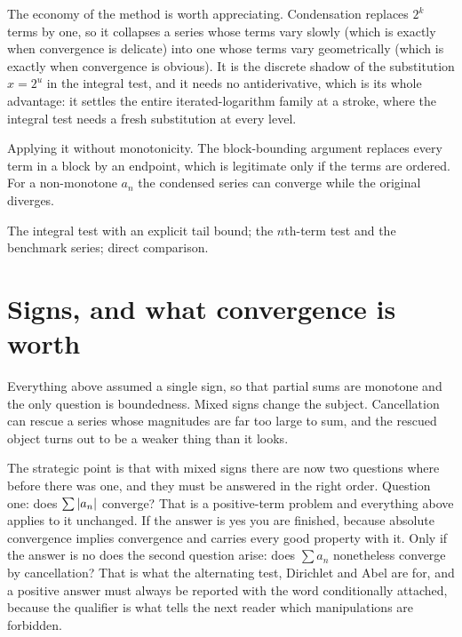 The economy of the method is worth appreciating. Condensation replaces $2^{k}$ terms by one, so it collapses a series whose terms vary slowly (which is exactly when convergence is delicate) into one whose terms vary geometrically (which is exactly when convergence is obvious). It is the discrete shadow of the substitution $x=2^{u}$ in the integral test, and it needs no antiderivative, which is its whole advantage: it settles the entire iterated-logarithm family at a stroke, where the integral test needs a fresh substitution at every level.

\begin{trap}
Applying it without monotonicity. The block-bounding argument replaces every term in a block by an endpoint, which is legitimate only if the terms are ordered. For a non-monotone $a_n$ the condensed series can converge while the original diverges.
\end{trap}

\begin{seealsob}The integral test with an explicit tail bound; the $n$th-term test and the benchmark series; direct comparison.\end{seealsob}

\section{Signs, and what convergence is worth}

Everything above assumed a single sign, so that partial sums are monotone and the only question is boundedness. Mixed signs change the subject. Cancellation can rescue a series whose magnitudes are far too large to sum, and the rescued object turns out to be a weaker thing than it looks.

The strategic point is that with mixed signs there are now two questions where before there was one, and they must be answered in the right order. Question one: does $\sum\left\lvert a_n\right\rvert$ converge? That is a positive-term problem and everything above applies to it unchanged. If the answer is yes you are finished, because absolute convergence implies convergence and carries every good property with it. Only if the answer is no does the second question arise: does $\sum a_n$ nonetheless converge by cancellation? That is what the alternating test, Dirichlet and Abel are for, and a positive answer must always be reported with the word conditionally attached, because the qualifier is what tells the next reader which manipulations are forbidden.

